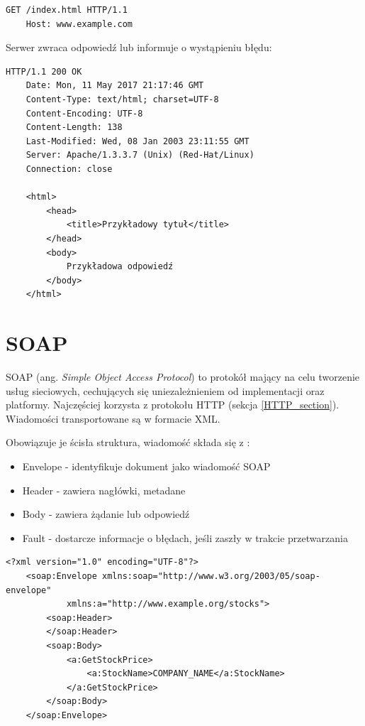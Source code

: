 \begin{lstlisting}[caption={Przykład żądania HTTP.},captionpos=b]
    GET /index.html HTTP/1.1
    Host: www.example.com
\end{lstlisting}

Serwer zwraca odpowiedź lub informuje o wystąpieniu błędu:

\begin{lstlisting}[caption={Przykład odpowiedzi serwera ze statusem 200 OK.},captionpos=b]
    HTTP/1.1 200 OK
    Date: Mon, 11 May 2017 21:17:46 GMT
    Content-Type: text/html; charset=UTF-8
    Content-Encoding: UTF-8
    Content-Length: 138
    Last-Modified: Wed, 08 Jan 2003 23:11:55 GMT
    Server: Apache/1.3.3.7 (Unix) (Red-Hat/Linux)
    Connection: close

    <html>
        <head>
            <title>Przykładowy tytuł</title>
        </head>
        <body>
            Przykładowa odpowiedź
        </body>
    </html>
\end{lstlisting}


\section{SOAP}

SOAP (ang. \textit{Simple Object Access Protocol}) to protokół mający na celu tworzenie usług sieciowych, cechujących się uniezależnieniem od implementacji oraz platformy. Najczęściej korzysta z protokołu HTTP (sekcja \ref{HTTP_section}). Wiadomości transportowane są w formacie XML.

Obowiązuje je ścisła struktura, wiadomość składa się z \cite{SOAP}:
\begin{itemize}
    \item Envelope - identyfikuje dokument jako wiadomość SOAP
    \item Header - zawiera nagłówki, metadane
    \item Body - zawiera żądanie lub odpowiedź
    \item Fault - dostarcze informacje o błędach, jeśli zaszły w trakcie przetwarzania
\end{itemize}

\begin{lstlisting}[caption={Przykład zapytania, które jest zgodne z protokołem SOAP.},captionpos=b]
    <?xml version="1.0" encoding="UTF-8"?>
    <soap:Envelope xmlns:soap="http://www.w3.org/2003/05/soap-envelope"
            xmlns:a="http://www.example.org/stocks">
        <soap:Header>
        </soap:Header>
        <soap:Body>
            <a:GetStockPrice>
                <a:StockName>COMPANY_NAME</a:StockName>
            </a:GetStockPrice>
        </soap:Body>
    </soap:Envelope>
\end{lstlisting}


